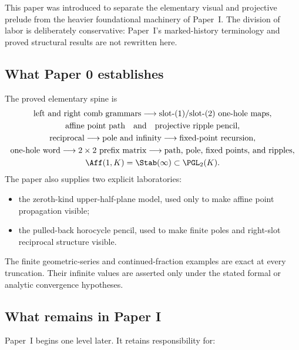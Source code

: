 This paper was introduced to separate the elementary visual and projective
prelude from the heavier foundational machinery of Paper~I.  The division of
labor is deliberately conservative: Paper~I's marked-history terminology and
proved structural results are not rewritten here.

\subsection{What Paper 0 establishes}

The proved elementary spine is
\[
\begin{gathered}
  \text{left and right comb grammars}
  \longrightarrow
  \text{slot-$(1)$/slot-$(2)$ one-hole maps},\\
  \text{affine point path}
  \quad\text{and}\quad
  \text{projective ripple pencil},\\
  \text{reciprocal}
  \longrightarrow
  \text{pole and infinity}
  \longrightarrow
  \text{fixed-point recursion},\\
  \text{one-hole word}
  \longrightarrow
  \text{$2\times2$ prefix matrix}
  \longrightarrow
  \text{path, pole, fixed points, and ripples},\\
  \Aff(1,K)=\Stab(\infty)
  \subset
  \PGL_2(K).
\end{gathered}
\]
The paper also supplies two explicit laboratories:

\begin{itemize}
  \item the zeroth-kind upper-half-plane model, used only to make affine point
  propagation visible;
  \item the pulled-back horocycle pencil, used to make finite poles and
  right-slot reciprocal structure visible.
\end{itemize}

The finite geometric-series and continued-fraction examples are exact at every
truncation.  Their infinite values are asserted only under the stated formal or
analytic convergence hypotheses.

\subsection{What remains in Paper I}

Paper~I begins one level later.  It retains responsibility for:

